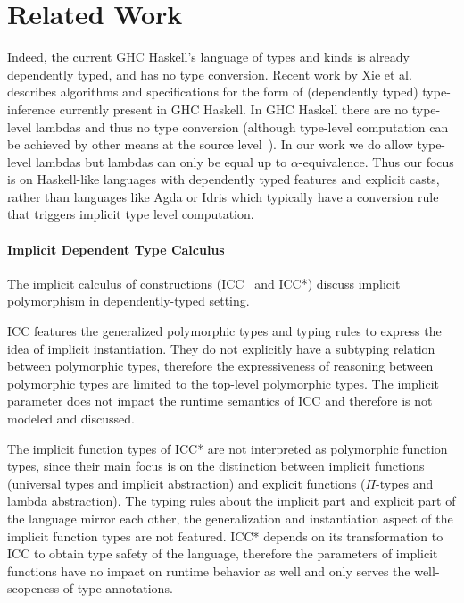 \section{Related Work}

Indeed, the current GHC Haskell's language of types and kinds
is already dependently typed, and has no type conversion. Recent work by
Xie et al.~\cite{xie20kind} describes algorithms and specifications
for the form of (dependently typed) type-inference currently present in GHC Haskell.
In GHC Haskell there are no type-level lambdas and thus no type conversion
(although type-level computation can be achieved by other means at the source
level~\cite{Chakravarty05associated}). In our work we do allow type-level lambdas
but lambdas can only be equal up to $\alpha$-equivalence.
Thus our focus is on Haskell-like languages with dependently typed
features and explicit casts, rather than languages like Agda or Idris
which typically have a conversion rule that triggers implicit type level
computation.

\paragraph{Implicit Dependent Type Calculus}

The implicit calculus of constructions (ICC~\cite{miquel2001implicit} and
ICC*\cite{barras2008implicit}) discuss implicit polymorphism in dependently-typed
setting.

ICC features the generalized polymorphic types and typing rules to express
the idea of implicit instantiation. They do not explicitly have a subtyping
relation between polymorphic types, therefore the expressiveness of reasoning
between polymorphic types are limited to the top-level polymorphic types. The
implicit parameter does not impact the runtime semantics of ICC and therefore
is not modeled and discussed.

The implicit function types of ICC* are not interpreted as polymorphic
function types, since their main focus is on the distinction between implicit
functions (universal types and implicit abstraction) and explicit functions
($\Pi$-types and lambda abstraction).
The typing rules about the implicit part and explicit part of the language mirror
each other, the generalization and instantiation aspect of the implicit function
types are not featured. ICC* depends on its transformation to ICC to obtain type safety
of the language, therefore the parameters of implicit functions have no impact
on runtime behavior as well and only serves the well-scopeness of type annotations.

